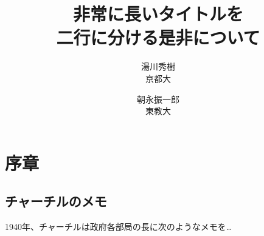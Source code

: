\documentclass[titlepage]{jlreq}
\begin{document}
\title{非常に長いタイトルを \\ 二行に分ける是非について}
\author{湯川秀樹\\ 京都大 \and 朝永振一郎 \\ 東教大} 
\maketitle

\section{序章}
\subsection{チャーチルのメモ}
 1940年、チャーチルは政府各部局の長に次のようなメモを…
\end{document}
